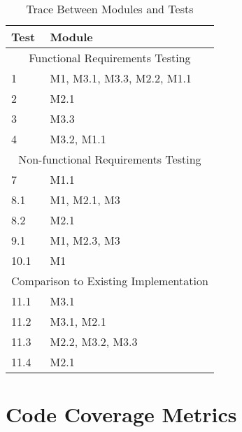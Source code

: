 \documentclass[12pt, titlepage]{article}
\begin{document}
\begin{table}[H!]
\centering
\begin{tabular}{p{} p{}}
\toprule
\textbf{Test} & \textbf{Module}\\
\midrule
\multicolumn{2}{c}{Functional Requirements Testing} \\
\midrule
1 & M1, M3.1, M3.3, M2.2, M1.1 \\
2 & M2.1 \\
3 & M3.3 \\
4 & M3.2, M1.1 \\
\midrule
\multicolumn{2}{c}{Non-functional Requirements Testing} \\
\midrule
7 & M1.1\\
8.1 & M1, M2.1, M3\\
8.2 & M2.1\\
9.1 &  M1, M2.3, M3\\
10.1 & M1\\
\midrule
\multicolumn{2}{c}{Comparison to Existing Implementation} \\
\midrule
11.1 & M3.1\\
11.2 & M3.1, M2.1\\
11.3 & M2.2, M3.2, M3.3 \\
11.4 & M2.1\\
\bottomrule
\end{tabular}
\caption{Trace Between Modules and Tests}
\end{table}
		

\section{Code Coverage Metrics} %


\end{document}

